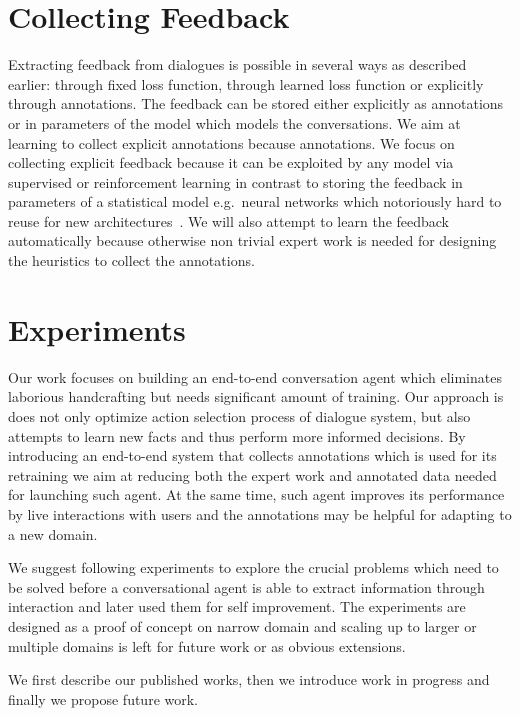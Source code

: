 \documentclass[11pt]{article}
\begin{document}
\section{Collecting Feedback}
\label{sec:learn_feedback}
Extracting feedback from dialogues is possible in several ways as described earlier: through fixed loss function, through learned loss function or explicitly through annotations.
The feedback can be stored either explicitly as annotations or in parameters of the model which models the conversations.
We aim at learning to collect explicit annotations because annotations.
We focus on collecting explicit feedback because it can be exploited by any model via supervised or reinforcement learning in contrast to storing the feedback in parameters of a statistical model e.g.\ neural networks which notoriously hard to reuse for new architectures~\cite{oquab_learning_2014}.
We will also attempt to learn the feedback automatically because otherwise non trivial expert work is needed for designing the heuristics to collect the annotations.

\section{Experiments} \label{sec:experiments}

Our work focuses on building an end-to-end conversation agent which eliminates laborious handcrafting but needs significant amount of training. 
Our approach is does not only optimize action selection process of dialogue system, but also attempts to learn new facts and thus perform more informed decisions.
By introducing an end-to-end system that collects annotations which is used for its retraining we aim at reducing both the expert work and annotated data needed for launching such agent.
At the same time, such agent improves its performance by live interactions with users and the annotations may be helpful for adapting to a new domain.


We suggest following experiments to explore the crucial problems which need to be solved before a conversational agent is able to extract information through interaction and later used them for self improvement.
The experiments are designed as a proof of concept on narrow domain and scaling up to larger or multiple domains is left for future work or as obvious extensions. 

We first describe our published works, then we introduce work in progress and finally we propose future work. 
\end{document}
